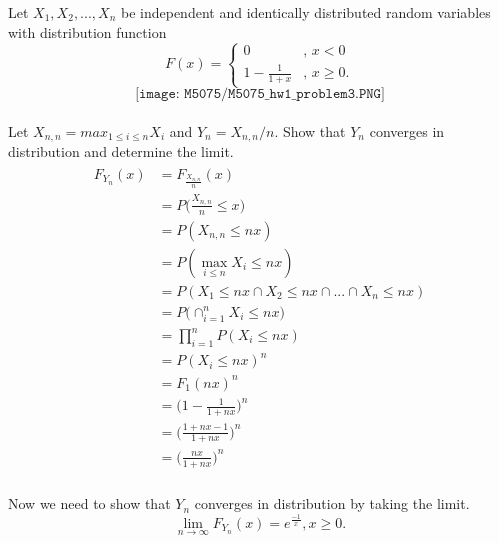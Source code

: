 \documentclass[11pt]{article}
\theoremstyle{definition}
\newcommand{\1}[1]{\mathbf{1} \left \{ #1 \right \}}
\begin{document}
\item Let $X_1, X_2, ..., X_n$ be independent and identically distributed random variables with distribution function
\[F(x) =
\begin{cases}
0&\text{, $x < 0$} \\ 1 - \frac{1}{1+x}&\text{, $x \geq 0$.}
\end{cases}
\]
\[\texttt{[image: M5075/M5075\_hw1\_problem3.PNG]}\]
\\ Let \(X_{n,n} = max_{1 \leq i \leq n} X_i\) and \(Y_n = X_{n,n}/n\).  Show that $Y_n$ converges in distribution and determine the limit.
\\
\begin{align*}
    \begin{split}
        F_{Y_n} (x) & = F_{\frac{X_{n,n}}{n}} (x) \\
        & = P\bigg(\frac{X_{n,n}}{n} \leq x\bigg) \\
        & = P(X_{n,n} \leq nx) \\
        & = P(\max_{i \leq n} X_i \leq nx) \\
        & = P(X_1 \leq nx \cap X_2 \leq nx \cap ... \cap X_n \leq nx) \\
        & = P\Big(\cap_{i=1}^n X_i \leq nx\Big) \\
        & = \prod_{i=1}^{n} P(X_i \leq nx) \\
        & = P(X_i \leq nx)^n \\
        & = F_1 (nx)^n \\
        & = \bigg(1 - \frac{1}{1 + nx}\bigg)^n \\
        & = \bigg(\frac{1 + nx - 1}{1 + nx} \bigg)^n \\
        & = \bigg(\frac{nx}{1 + nx}\bigg)^n
   \end{split}
\end{align*}
\\
Now we need to show that $Y_n$ converges in distribution by taking the limit. \\
\[ \lim_{n\to\infty} F_{Y_n} (x) = e^{\frac{-1}{x}} , x \geq 0.\]
\end{document}
